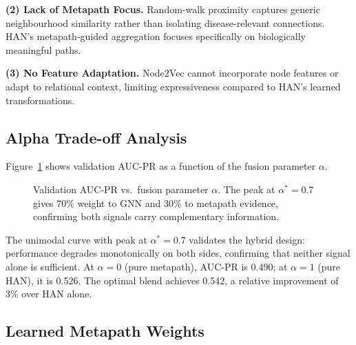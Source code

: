 \documentclass{article}
\begin{document}
\textbf{(2) Lack of Metapath Focus.} Random-walk proximity captures generic neighbourhood similarity rather than isolating disease-relevant connections. HAN's metapath-guided aggregation focuses specifically on biologically meaningful paths.

\textbf{(3) No Feature Adaptation.} Node2Vec cannot incorporate node features or adapt to relational context, limiting expressiveness compared to HAN's learned transformations.

\subsection{Alpha Trade-off Analysis}

Figure~\ref{fig:alpha} shows validation AUC-PR as a function of the fusion parameter $\alpha$.

\begin{figure}[h]
\centering
{}
\caption{Validation AUC-PR vs.\ fusion parameter $\alpha$. The peak at $\alpha^*=0.7$ gives 70\% weight to GNN and 30\% to metapath evidence, confirming both signals carry complementary information.}
\label{fig:alpha}
\end{figure}

The unimodal curve with peak at $\alpha^*=0.7$ validates the hybrid design: performance degrades monotonically on both sides, confirming that neither signal alone is sufficient. At $\alpha=0$ (pure metapath), AUC-PR is 0.490; at $\alpha=1$ (pure HAN), it is 0.526. The optimal blend achieves 0.542, a relative improvement of 3\% over HAN alone.

\subsection{Learned Metapath Weights}
\end{document}
